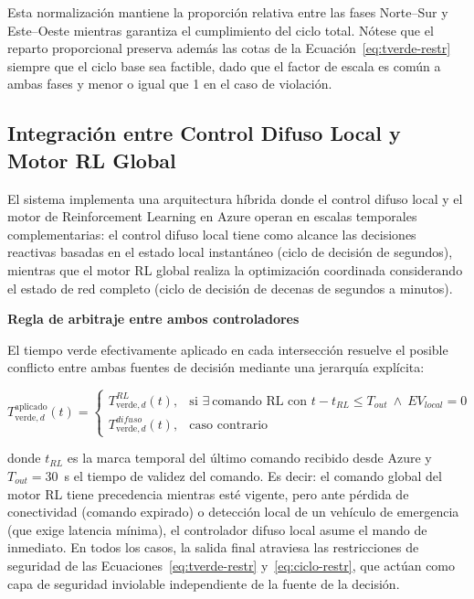 \documentclass[12pt,a4paper,oneside]{report}
\begin{document}
Esta normalización mantiene la proporción relativa entre las fases Norte--Sur y Este--Oeste mientras garantiza el cumplimiento del ciclo total. Nótese que el reparto proporcional preserva además las cotas de la Ecuación~\ref{eq:tverde-restr} siempre que el ciclo base sea factible, dado que el factor de escala es común a ambas fases y menor o igual que 1 en el caso de violación.

\subsection{Integración entre Control Difuso Local y Motor RL Global}\label{integraciuxf3n-entre-control-difuso-local-y-motor-rl-global}

El sistema implementa una arquitectura híbrida donde el control difuso local y el motor de Reinforcement Learning en Azure operan en escalas temporales complementarias: el control difuso local tiene como alcance las decisiones reactivas basadas en el estado local instantáneo (ciclo de decisión de segundos), mientras que el motor RL global realiza la optimización coordinada considerando el estado de red completo (ciclo de decisión de decenas de segundos a minutos).

\textbf{Regla de arbitraje entre ambos controladores}

El tiempo verde efectivamente aplicado en cada intersección resuelve el posible conflicto entre ambas fuentes de decisión mediante una jerarquía explícita:

\begin{equation}
T_{\text{verde},d}^{\text{aplicado}}(t) =
\begin{cases}
T_{\text{verde},d}^{RL}(t), & \text{si } \exists\ \text{comando RL con } t - t_{RL} \leq T_{out} \ \land\ EV_{local} = 0\\[3pt]
T_{\text{verde},d}^{difuso}(t), & \text{caso contrario}
\end{cases}
\label{eq:arbitraje}
\end{equation}

donde \(t_{RL}\) es la marca temporal del último comando recibido desde Azure y \(T_{out} = 30\)~s el tiempo de validez del comando. Es decir: el comando global del motor RL tiene precedencia mientras esté vigente, pero ante pérdida de conectividad (comando expirado) o detección local de un vehículo de emergencia (que exige latencia mínima), el controlador difuso local asume el mando de inmediato. En todos los casos, la salida final atraviesa las restricciones de seguridad de las Ecuaciones~\ref{eq:tverde-restr} y~\ref{eq:ciclo-restr}, que actúan como capa de seguridad inviolable independiente de la fuente de la decisión.
\end{document}
